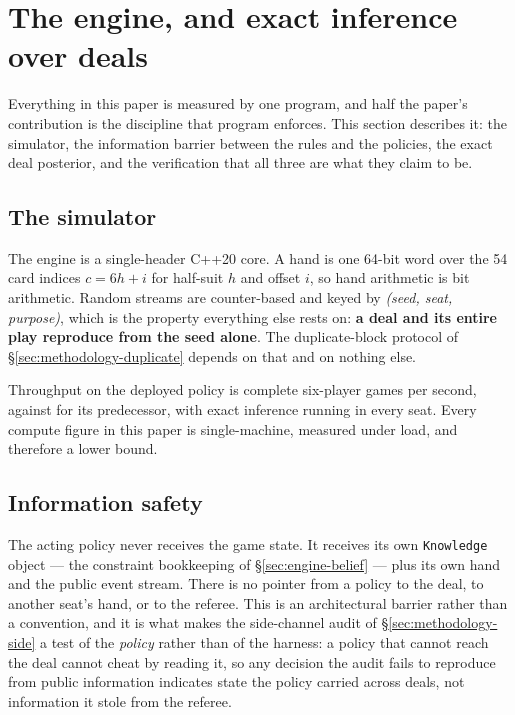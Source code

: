 \section{The engine, and exact inference over deals}
\label{sec:engine}

Everything in this paper is measured by one program, and half the paper's contribution is the
discipline that program enforces. This section describes it: the simulator, the information barrier
between the rules and the policies, the exact deal posterior, and the verification that all three
are what they claim to be.

\subsection{The simulator}
\label{sec:engine-impl}

The engine is a single-header C++20 core. A hand is one 64-bit word over the 54 card indices
$c = 6h + i$ for half-suit $h$ and offset $i$, so hand arithmetic is bit arithmetic. Random streams
are counter-based and keyed by \emph{(seed, seat, purpose)}, which is the property everything else
rests on: \textbf{a deal and its entire play reproduce from the seed alone}. The duplicate-block
protocol of \S\ref{sec:methodology-duplicate} depends on that and on nothing else.

Throughput on the deployed policy is \vsixThroughputSix{} complete six-player games per second,
against \vsixThroughputFive{} for its predecessor, with exact inference running in every seat.
Every compute figure in this paper is single-machine, measured under load, and therefore a lower
bound.

\subsection{Information safety}
\label{sec:engine-safety}

The acting policy never receives the game state. It receives its own \texttt{Knowledge} object ---
the constraint bookkeeping of \S\ref{sec:engine-belief} --- plus its own hand and the public event
stream. There is no pointer from a policy to the deal, to another seat's hand, or to the referee.
This is an architectural barrier rather than a convention, and it is what makes the side-channel
audit of \S\ref{sec:methodology-side} a test of the \emph{policy} rather than of the harness: a
policy that cannot reach the deal cannot cheat by reading it, so any decision the audit fails to
reproduce from public information indicates state the policy carried across deals, not information
it stole from the referee.

